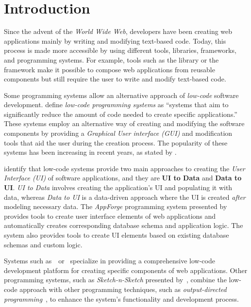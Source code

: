 \chapter*{Introduction}

Since the advent of the \emph{World Wide Web}, developers have been creating web applications mainly by writing and modifying text-based code.
Today, this process is made more accessible by using different tools, libraries, frameworks, and programming systems.
For example, tools such as the \citet{react} library or the \citet{vuejs} framework make it possible to compose web applications from reusable components but still require the user to write and modify text-based code.

Some programming systems allow an alternative approach of \emph{low-code} software development.
\citet{Pinho_Aguiar_Amaral_2023} define \emph{low-code programming systems} as ``systems that aim to significantly reduce the amount of code needed to create specific applications.''
These systems employ an alternative way of creating and modifying the software components by providing a \emph{Graphical User interface (GUI)} and modification tools that aid the user during the creation process.
The popularity of these systems has been increasing in recent years, as stated by \citet{Sahay_Indamutsa_Di}.

\citet{Sahay_Indamutsa_Di} identify that low-code systems provide two main approaches to creating the \emph{User Interface (UI)} of software applications, and they are \textbf{UI to Data} and \textbf{Data to UI}.
\emph{UI to Data} involves creating the application's UI and populating it with data, whereas \emph{Data to UI} is a data-driven approach where the UI is created \emph{after} modeling necessary data.
The \emph{AppForge} programming system presented by~\citet{Yang_Gupta_Botev_Churchill_Levchenko_Shanmugasundaram_2008} provides tools to create user interface elements of web applications and automatically creates corresponding database schema and application logic.
The system also provides tools to create UI elements based on existing database schemas and custom logic.

Systems such as~\citet{mendix}~or~\citet{darklang} specialize in providing a comprehensive low-code development platform for creating specific components of web applications.
Other programming systems, such as \emph{Sketch-n-Sketch} presented by~\citet{sketch-and-sketch}, combine the low-code approach
with other programming techniques, such as \emph{output-directed programming}~\cite{output-directed-programming}, to enhance the system's functionality and development process.

